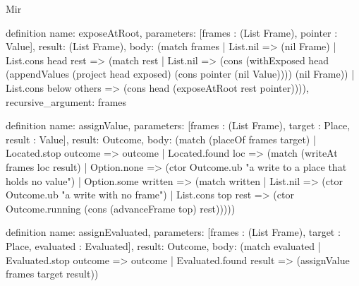 \begin{lexlean}{Mir}
\begin{semanticmodule}
definition{
  name: exposeAtRoot,
  parameters: [frames : (List Frame), pointer : Value],
  result: (List Frame),
  body: (match frames
    | List.nil => (nil Frame)
    | List.cons head rest => (match rest
      | List.nil => (cons (withExposed head (appendValues (project head exposed) (cons pointer (nil Value)))) (nil Frame))
      | List.cons below others => (cons head (exposeAtRoot rest pointer)))),
  recursive_argument: frames
}

definition{
  name: assignValue,
  parameters: [frames : (List Frame), target : Place, result : Value],
  result: Outcome,
  body: (match (placeOf frames target)
    | Located.stop outcome => outcome
    | Located.found loc => (match (writeAt frames loc result)
      | Option.none => (ctor Outcome.ub "a write to a place that holds no value")
      | Option.some written => (match written
        | List.nil => (ctor Outcome.ub "a write with no frame")
        | List.cons top rest => (ctor Outcome.running (cons (advanceFrame top) rest)))))
}

definition{
  name: assignEvaluated,
  parameters: [frames : (List Frame), target : Place, evaluated : Evaluated],
  result: Outcome,
  body: (match evaluated
    | Evaluated.stop outcome => outcome
    | Evaluated.found result => (assignValue frames target result))
}


\end{semanticmodule}
\end{lexlean}
